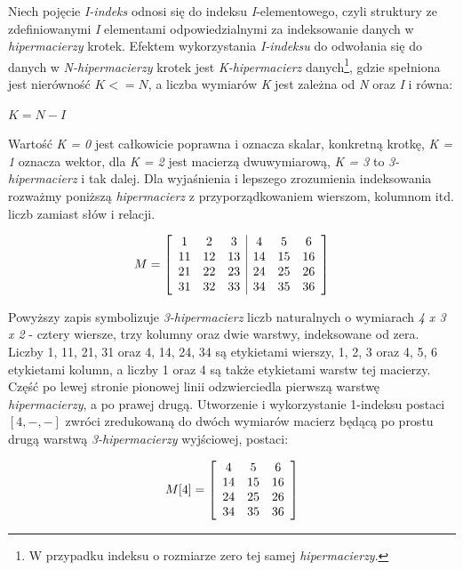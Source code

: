 \par
Niech pojęcie \emph{I-indeks} odnosi się do indeksu \emph{I}-elementowego, czyli struktury ze zdefiniowanymi \emph{I} elementami odpowiedzialnymi za indeksowanie danych w \emph{hipermacierzy} krotek.
Efektem wykorzystania \emph{I-indeksu} do odwołania się do danych w \emph{N-hipermacierzy} krotek jest \emph{K-hipermacierz} danych\footnote{W przypadku indeksu o rozmiarze zero tej samej \emph{hipermacierzy}.}, gdzie spełniona jest nierówność \( K <= N \), a liczba wymiarów \emph{K} jest zależna od \emph{N} oraz \emph{I} i równa:

\begin{center}
\( K = N - I \)
\end{center}

Wartość \emph{K = 0} jest całkowicie poprawna i oznacza skalar, konkretną krotkę, \emph{K = 1} oznacza wektor, dla \emph{K = 2} jest macierzą dwuwymiarową, \emph{K = 3} to \emph{3-hipermacierz} i tak dalej.
Dla wyjaśnienia i lepszego zrozumienia indeksowania rozważmy poniższą \emph{hipermacierz} z przyporządkowaniem wierszom, kolumnom itd. liczb zamiast słów i relacji.
\begin{center}
\[
M = 
\left[
\begin{array}{c c c | c c c}
1 	& 2 	& 3 	& 4 	& 5 	& 6 	\\
11 	& 12 	& 13 	& 14 	& 15 	& 16 	\\
21 	& 22 	& 23 	& 24 	& 25 	& 26 	\\
31 	& 32 	& 33 	& 34 	& 35	& 36 	\\
\end{array}
\right]
\]
\end{center}

Powyższy zapis symbolizuje \emph{3-hipermacierz} liczb naturalnych o wymiarach \emph{4 x 3 x 2} - cztery wiersze, trzy kolumny oraz dwie warstwy, indeksowane od zera. 
Liczby 1, 11, 21, 31 oraz 4, 14, 24, 34 są etykietami wierszy, 1, 2, 3 oraz 4, 5, 6 etykietami kolumn, a liczby 1 oraz 4 są także etykietami warstw tej macierzy.
Część po lewej stronie pionowej linii odzwierciedla pierwszą warstwę \emph{hipermacierzy}, a po prawej drugą.
Utworzenie i wykorzystanie 1-indeksu postaci \( [4, -, -] \) zwróci zredukowaną do dwóch wymiarów macierz będącą po prostu drugą warstwą \emph{3-hipermacierzy} wyjściowej, postaci:

\[
M[4] = 
\left[
\begin{array}{c c c}
4 	& 5 	& 6 	\\
14 	& 15 	& 16 	\\
24 	& 25 	& 26 	\\
34 	& 35	& 36 	\\
\end{array}
\right]
\]

